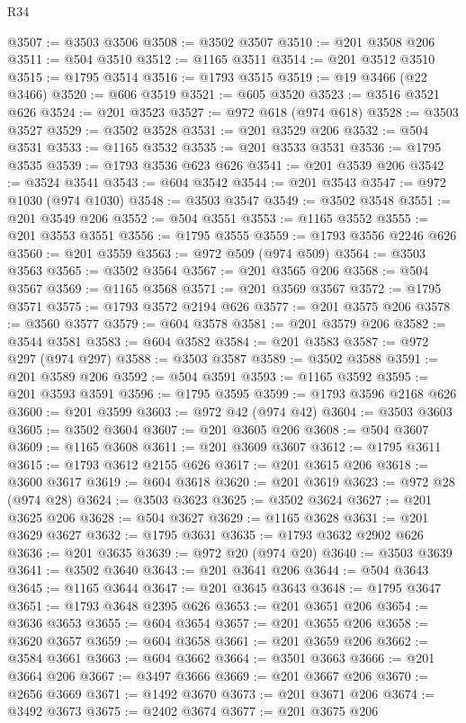 \begin{lexlean}{R34}
\begin{coremodule}
@3507 := @3503 @3506
@3508 := @3502 @3507
@3510 := @201 @3508 @206
@3511 := @504 @3510
@3512 := @1165 @3511
@3514 := @201 @3512 @3510
@3515 := @1795 @3514
@3516 := @1793 @3515
@3519 := @19 @3466 (@22 @3466)
@3520 := @606 @3519
@3521 := @605 @3520
@3523 := @3516 @3521 @626
@3524 := @201 @3523
@3527 := @972 @618 (@974 @618)
@3528 := @3503 @3527
@3529 := @3502 @3528
@3531 := @201 @3529 @206
@3532 := @504 @3531
@3533 := @1165 @3532
@3535 := @201 @3533 @3531
@3536 := @1795 @3535
@3539 := @1793 @3536 @623 @626
@3541 := @201 @3539 @206
@3542 := @3524 @3541
@3543 := @604 @3542
@3544 := @201 @3543
@3547 := @972 @1030 (@974 @1030)
@3548 := @3503 @3547
@3549 := @3502 @3548
@3551 := @201 @3549 @206
@3552 := @504 @3551
@3553 := @1165 @3552
@3555 := @201 @3553 @3551
@3556 := @1795 @3555
@3559 := @1793 @3556 @2246 @626
@3560 := @201 @3559
@3563 := @972 @509 (@974 @509)
@3564 := @3503 @3563
@3565 := @3502 @3564
@3567 := @201 @3565 @206
@3568 := @504 @3567
@3569 := @1165 @3568
@3571 := @201 @3569 @3567
@3572 := @1795 @3571
@3575 := @1793 @3572 @2194 @626
@3577 := @201 @3575 @206
@3578 := @3560 @3577
@3579 := @604 @3578
@3581 := @201 @3579 @206
@3582 := @3544 @3581
@3583 := @604 @3582
@3584 := @201 @3583
@3587 := @972 @297 (@974 @297)
@3588 := @3503 @3587
@3589 := @3502 @3588
@3591 := @201 @3589 @206
@3592 := @504 @3591
@3593 := @1165 @3592
@3595 := @201 @3593 @3591
@3596 := @1795 @3595
@3599 := @1793 @3596 @2168 @626
@3600 := @201 @3599
@3603 := @972 @42 (@974 @42)
@3604 := @3503 @3603
@3605 := @3502 @3604
@3607 := @201 @3605 @206
@3608 := @504 @3607
@3609 := @1165 @3608
@3611 := @201 @3609 @3607
@3612 := @1795 @3611
@3615 := @1793 @3612 @2155 @626
@3617 := @201 @3615 @206
@3618 := @3600 @3617
@3619 := @604 @3618
@3620 := @201 @3619
@3623 := @972 @28 (@974 @28)
@3624 := @3503 @3623
@3625 := @3502 @3624
@3627 := @201 @3625 @206
@3628 := @504 @3627
@3629 := @1165 @3628
@3631 := @201 @3629 @3627
@3632 := @1795 @3631
@3635 := @1793 @3632 @2902 @626
@3636 := @201 @3635
@3639 := @972 @20 (@974 @20)
@3640 := @3503 @3639
@3641 := @3502 @3640
@3643 := @201 @3641 @206
@3644 := @504 @3643
@3645 := @1165 @3644
@3647 := @201 @3645 @3643
@3648 := @1795 @3647
@3651 := @1793 @3648 @2395 @626
@3653 := @201 @3651 @206
@3654 := @3636 @3653
@3655 := @604 @3654
@3657 := @201 @3655 @206
@3658 := @3620 @3657
@3659 := @604 @3658
@3661 := @201 @3659 @206
@3662 := @3584 @3661
@3663 := @604 @3662
@3664 := @3501 @3663
@3666 := @201 @3664 @206
@3667 := @3497 @3666
@3669 := @201 @3667 @206
@3670 := @2656 @3669
@3671 := @1492 @3670
@3673 := @201 @3671 @206
@3674 := @3492 @3673
@3675 := @2402 @3674
@3677 := @201 @3675 @206

\end{coremodule}
\end{lexlean}
